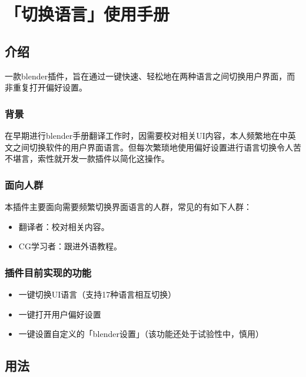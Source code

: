 \documentclass{../../PublicResources/DocClass}
\begin{document}
\maketitle
\frontmatter
{}
{}
\mainmatter

\chapter{「切换语言」使用手册}
\section{介绍}
一款blender插件，旨在通过一键快速、轻松地在两种语言之间切换用户界面，而非重复打开偏好设置。

\subsection{背景}
在早期进行blender手册翻译工作时，因需要校对相关UI内容，本人频繁地在中英文之间切换软件的用户界面语言。但每次繁琐地使用偏好设置进行语言切换令人苦不堪言，索性就开发一款插件以简化这操作。

\subsection{面向人群}
本插件主要面向需要频繁切换界面语言的人群，常见的有如下人群：
\begin{itemize}
    \item 翻译者：校对相关内容。
    \item CG学习者：跟进外语教程。
\end{itemize}

\subsection{插件目前实现的功能}
\begin{itemize}
    \item 一键切换UI语言（支持17种语言相互切换）
    \item 一键打开用户偏好设置
    \item 一键设置自定义的「blender设置」（{\color{red}该功能还处于试验性中，慎用}）
\end{itemize}


\section{用法}
\end{document}

